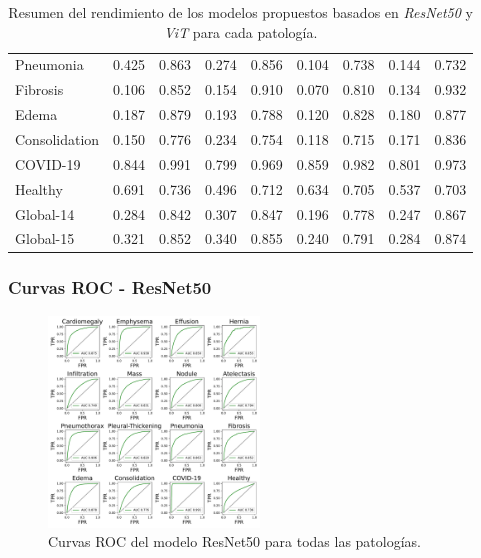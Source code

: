 \begin{frame}
\begin{table}[ht!]
\begin{tabular}{|l||c|c|c|c||c|c|c|c|}
        Pneumonia       & 0.425 & 0.863 & 0.274 & 0.856 & 0.104 & 0.738 & 0.144 & 0.732 \\
        Fibrosis        & 0.106 & 0.852 & 0.154 & 0.910 & 0.070 & 0.810 & 0.134 & 0.932 \\
        Edema           & 0.187 & 0.879 & 0.193 & 0.788 & 0.120 & 0.828 & 0.180 & 0.877 \\
        Consolidation   & 0.150 & 0.776 & 0.234 & 0.754 & 0.118 & 0.715 & 0.171 & 0.836 \\
        \hline
        COVID-19        & 0.844 & 0.991 & 0.799 & 0.969 & 0.859 & 0.982 & 0.801 & 0.973 \\
        Healthy         & 0.691 & 0.736 & 0.496 & 0.712 & 0.634 & 0.705 & 0.537 & 0.703 \\
        \hline\hline
        Global-14       & 0.284 & 0.842 & 0.307 & 0.847 & 0.196 & 0.778 & 0.247 & 0.867 \\
        Global-15       & 0.321 & 0.852 & 0.340 & 0.855 & 0.240 & 0.791 & 0.284 & 0.874 \\
        \hline
    \end{tabular}
    \caption{Resumen del rendimiento de los modelos propuestos basados en \textit{ResNet50} y \textit{ViT} para cada patología.}
    \label{table:res-vit-model-covid}
\end{table}
\end{frame}

\begin{frame}
\frametitle{Curvas ROC - ResNet50}
\begin{figure}[ht!]
    \centering
    \includegraphics[width=0.5\textwidth]{../Chapters/4. ViT-Lung/images/ROC_AUC.pdf}
    \caption{Curvas ROC del modelo ResNet50 para todas las patologías.}
\end{figure}
\end{frame}

